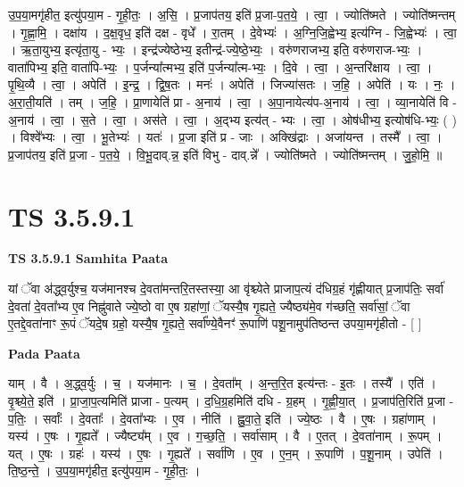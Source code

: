 \documentclass[17pt]{extarticle}
\begin{document}
उ॒प॒या॒मगृ॑हीत॒ इत्यु॑पया॒म - गृ॒ही॒तः॒ । अ॒सि॒ । प्र॒जाप॑तय॒ इति॑ प्र॒जा-प॒त॒ये॒ । त्वा॒ । ज्योति॑ष्मते । ज्योति॑ष्मन्तम् । गृ॒ह्णा॒मि॒ । दक्षा॑य । द॒क्ष॒वृध॒ इति॑ दक्ष - वृधे᳚ । रा॒तम् । दे॒वेभ्यः॑ । अ॒ग्नि॒जि॒ह्वेभ्य॒ इत्य॑ग्नि - जि॒ह्वेभ्यः॑ । त्वा॒ । ऋ॒ता॒युभ्य॒ इत्यृ॑ता॒यु - भ्यः॒ । इन्द्र॑ज्येष्ठेभ्य॒ इतीन्द्र॑-ज्ये॒ष्ठे॒भ्यः॒ । वरु॑णराजभ्य॒ इति॒ वरु॑णराज-भ्यः॒ । वाता॑पिभ्य॒ इति॒ वाता॑पि-भ्यः॒ । प॒र्जन्या᳚त्मभ्य॒ इति॑ प॒र्जन्या᳚त्म-भ्यः॒ । दि॒वे । त्वा॒ । अ॒न्तरि॑क्षाय । त्वा॒ । पृ॒थि॒व्यै । त्वा॒ । अपेति॑ । इ॒न्द्र॒ । द्वि॒ष॒तः । मनः॑ । अपेति॑ । जिज्या॑सतः । ज॒हि॒ । अपेति॑ । यः । नः॒ । अ॒रा॒ती॒यति॑ । तम् । ज॒हि॒ । प्रा॒णायेति॑ प्रा - अ॒नाय॑ । त्वा॒ । अ॒पा॒नायेत्य॑प-अ॒नाय॑ । त्वा॒ । व्या॒नायेति॑ वि - अ॒नाय॑ । त्वा॒ । स॒ते । त्वा॒ । अस॑ते । त्वा॒ । अ॒द्भ्य इत्य॑त् - भ्यः । त्वा॒ । ओष॑धीभ्य॒ इत्योष॑धि-भ्यः॒ ( ) । विश्वे᳚भ्यः । त्वा॒ । भू॒तेभ्यः॑ । यतः॑ । प्र॒जा इति॑ प्र - जाः । अक्खि॑द्राः । अजा॑यन्त । तस्मै᳚ । त्वा॒ । प्र॒जाप॑तय॒ इति॑ प्र॒जा - प॒त॒ये॒ । वि॒भू॒दाव्.न्न॒ इति॑ विभु - दाव्.न्ने᳚ । ज्योति॑ष्मते । ज्योति॑ष्मन्तम् । जु॒हो॒मि॒ ॥  \newline




\section*{ TS 3.5.9.1 }

\textbf{TS 3.5.9.1 } \newline
\textbf{Samhita Paata} \newline

यां ॅवा अ॑द्ध्व॒र्युश्च॒ यज॑मानश्च दे॒वता॑मन्तरि॒तस्तस्या॒ आ वृ॑श्च्येते प्राजाप॒त्यं द॑धिग्र॒हं गृ॑ह्णीयात् प्र॒जाप॑तिः॒ सर्वा॑ दे॒वता॑ दे॒वता᳚भ्य ए॒व निह्नु॑वाते ज्ये॒ष्ठो वा ए॒ष ग्रहा॑णां॒ ॅयस्यै॒ष गृ॒ह्यते॒ ज्यैष्ठ्य॑मे॒व ग॑च्छति॒ सर्वा॑सां॒ ॅवा ए॒तद्दे॒वता॑नाꣳ रू॒पं ॅयदे॒ष ग्रहो॒ यस्यै॒ष गृ॒ह्यते॒ सर्वा᳚ण्ये॒वैनꣳ॑ रू॒पाणि॑ पशू॒नामुप॑तिष्ठन्त उपया॒मगृ॑हीतो - [  ] \newline

\textbf{Pada Paata} \newline

याम् । वै । अ॒द्ध्व॒र्युः । च॒ । यज॑मानः । च॒ । दे॒वता᳚म् । अ॒न्त॒रि॒त इत्य॑न्तः - इ॒तः । तस्यै᳚ । एति॑ । वृ॒श्च्ये॒ते॒ इति॑ । प्रा॒जा॒प॒त्यमिति॑ प्राजा - प॒त्यम् । द॒धि॒ग्र॒हमिति॑ दधि - ग्र॒हम् । गृ॒ह्णी॒या॒त् । प्र॒जाप॑ति॒रिति॑ प्र॒जा - प॒तिः॒ । सर्वाः᳚ । दे॒वताः᳚ । दे॒वता᳚भ्यः । ए॒व । नीति॑ । ह्नु॒वा॒ते॒ इति॑ । ज्ये॒ष्ठः । वै । ए॒षः । ग्रहा॑णाम् । यस्य॑ । ए॒षः । गृ॒ह्यते᳚ । ज्यैष्ट्य᳚म् । ए॒व । ग॒च्छ॒ति॒ । सर्वा॑साम् । वै । ए॒तत् । दे॒वता॑नाम् । रू॒पम् । यत् । ए॒षः । ग्रहः॑ । यस्य॑ । ए॒षः । गृ॒ह्यते᳚ । सर्वा॑णि । ए॒व । ए॒न॒म् । रू॒पाणि॑ । प॒शू॒नाम् । उपेति॑ । ति॒ष्ठ॒न्ते॒ । उ॒प॒या॒मगृ॑हीत॒ इत्यु॑पया॒म - गृ॒ही॒तः॒ ।  \newline
\end{document}
